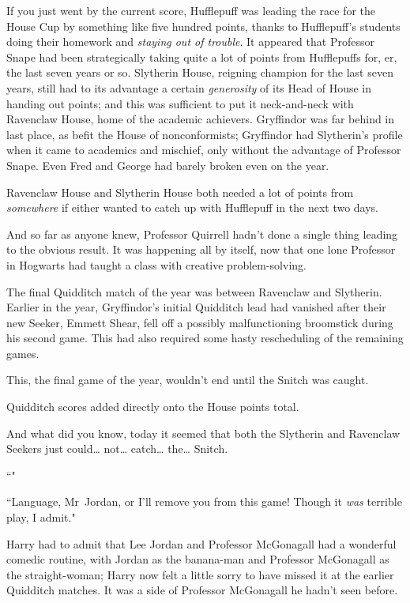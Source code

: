If you just went by the current score, Hufflepuff was leading the race for the House Cup by something like five hundred points, thanks to Hufflepuff's students doing their homework and \emph{staying out of trouble}. It appeared that Professor Snape had been strategically taking quite a lot of points from Hufflepuffs for, er, the last seven years or so. Slytherin House, reigning champion for the last seven years, still had to its advantage a certain \emph{generosity} of its Head of House in handing out points; and this was sufficient to put it neck-and-neck with Ravenclaw House, home of the academic achievers. Gryffindor was far behind in last place, as befit the House of nonconformists; Gryffindor had Slytherin's profile when it came to academics and mischief, only without the advantage of Professor Snape. Even Fred and George had barely broken even on the year.

Ravenclaw House and Slytherin House both needed a lot of points from \emph{somewhere} if either wanted to catch up with Hufflepuff in the next two days.

And so far as anyone knew, Professor Quirrell hadn't done a single thing leading to the obvious result. It was happening all by itself, now that one lone Professor in Hogwarts had taught a class with creative problem-solving.

The final Quidditch match of the year was between Ravenclaw and Slytherin. Earlier in the year, Gryffindor's initial Quidditch lead had vanished after their new Seeker, Emmett Shear, fell off a possibly malfunctioning broomstick during his second game. This had also required some hasty rescheduling of the remaining games.

This, the final game of the year, wouldn't end until the Snitch was caught.

Quidditch scores added directly onto the House points total.

And what did you know, today it seemed that both the Slytherin and Ravenclaw Seekers just could{\ldots} not{\ldots} catch{\ldots} the{\ldots} Snitch.

``"

``Language, Mr~Jordan, or I'll remove you from this game! Though it \emph{was} terrible play, I admit."

Harry had to admit that Lee Jordan and Professor McGonagall had a wonderful comedic routine, with Jordan as the banana-man and Professor McGonagall as the straight-woman; Harry now felt a little sorry to have missed it at the earlier Quidditch matches. It was a side of Professor McGonagall he hadn't seen before.

